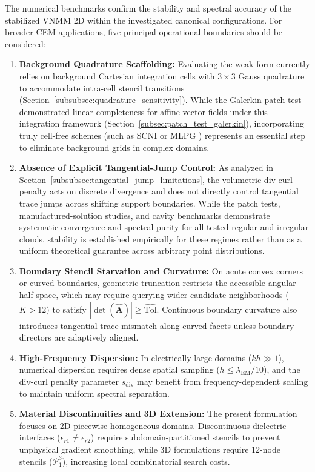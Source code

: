 \documentclass[preprint,12pt]{elsarticle}
\begin{document}
The numerical benchmarks confirm the stability and spectral accuracy of the stabilized VNMM 2D within the investigated canonical configurations. For broader CEM applications, five principal operational boundaries should be considered:
\begin{enumerate}
    \item \textbf{Background Quadrature Scaffolding:} Evaluating the weak form currently relies on background Cartesian integration cells with $3 \times 3$ Gauss quadrature to accommodate intra-cell stencil transitions (Section~\ref{subsubsec:quadrature_sensitivity}). While the Galerkin patch test demonstrated linear completeness for affine vector fields under this integration framework (Section~\ref{subsec:patch_test_galerkin}), incorporating truly cell-free schemes (such as SCNI \cite{chen2001stabilized} or MLPG \cite{atluri2002meshless}) represents an essential step to eliminate background grids in complex domains.

    \item \textbf{Absence of Explicit Tangential-Jump Control:} As analyzed in Section~\ref{subsubsec:tangential_jump_limitations}, the volumetric div-curl penalty acts on discrete divergence and does not directly control tangential trace jumps across shifting support boundaries. While the patch tests, manufactured-solution studies, and cavity benchmarks demonstrate systematic convergence and spectral purity for all tested regular and irregular clouds, stability is established empirically for these regimes rather than as a uniform theoretical guarantee across arbitrary point distributions.

    \item \textbf{Boundary Stencil Starvation and Curvature:} On acute convex corners or curved boundaries, geometric truncation restricts the accessible angular half-space, which may require querying wider candidate neighborhoods ($K > 12$) to satisfy $|\det(\widehat{\mathbf{A}})| \ge \widehat{\mathrm{Tol}}$. Continuous boundary curvature also introduces tangential trace mismatch along curved facets unless boundary directors are adaptively aligned.

    \item \textbf{High-Frequency Dispersion:} In electrically large domains ($kh \gg 1$), numerical dispersion requires dense spatial sampling ($h \le \lambda_{\mathrm{EM}} / 10$), and the div-curl penalty parameter $s_{\mathrm{div}}$ may benefit from frequency-dependent scaling to maintain uniform spectral separation.

    \item \textbf{Material Discontinuities and 3D Extension:} The present formulation focuses on 2D piecewise homogeneous domains. Discontinuous dielectric interfaces ($\epsilon_{r1} \neq \epsilon_{r2}$) require subdomain-partitioned stencils to prevent unphysical gradient smoothing, while 3D formulations require 12-node stencils ($\mathcal{P}_1^3$), increasing local combinatorial search costs.
\end{enumerate}
\end{document}
